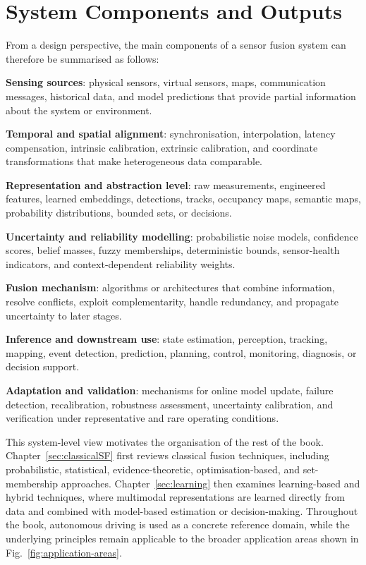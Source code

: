 \section{System Components and Outputs}
From a design perspective, the main components of a sensor fusion system can therefore be summarised as follows:
\begin{list4a}
    \item \textbf{Sensing sources}: physical sensors, virtual sensors, maps, communication messages, historical data, and model predictions that provide partial information about the system or environment.
    \item \textbf{Temporal and spatial alignment}: synchronisation, interpolation, latency compensation, intrinsic calibration, extrinsic calibration, and coordinate transformations that make heterogeneous data comparable.
    \item \textbf{Representation and abstraction level}: raw measurements, engineered features, learned embeddings, detections, tracks, occupancy maps, semantic maps, probability distributions, bounded sets, or decisions.
    \item \textbf{Uncertainty and reliability modelling}: probabilistic noise models, confidence scores, belief masses, fuzzy memberships, deterministic bounds, sensor-health indicators, and context-dependent reliability weights.
    \item \textbf{Fusion mechanism}: algorithms or architectures that combine information, resolve conflicts, exploit complementarity, handle redundancy, and propagate uncertainty to later stages.
    \item \textbf{Inference and downstream use}: state estimation, perception, tracking, mapping, event detection, prediction, planning, control, monitoring, diagnosis, or decision support.
    \item \textbf{Adaptation and validation}: mechanisms for online model update, failure detection, recalibration, robustness assessment, uncertainty calibration, and verification under representative and rare operating conditions.
\end{list4a}

This system-level view motivates the organisation of the rest of the book. Chapter~\ref{sec:classicalSF} first reviews classical fusion techniques, including probabilistic, statistical, evidence-theoretic, optimisation-based, and set-membership approaches. Chapter~\ref{sec:learning} then examines learning-based and hybrid techniques, where multimodal representations are learned directly from data and combined with model-based estimation or decision-making. Throughout the book, autonomous driving is used as a concrete reference domain, while the underlying principles remain applicable to the broader application areas shown in Fig.~\ref{fig:application-areas}.

